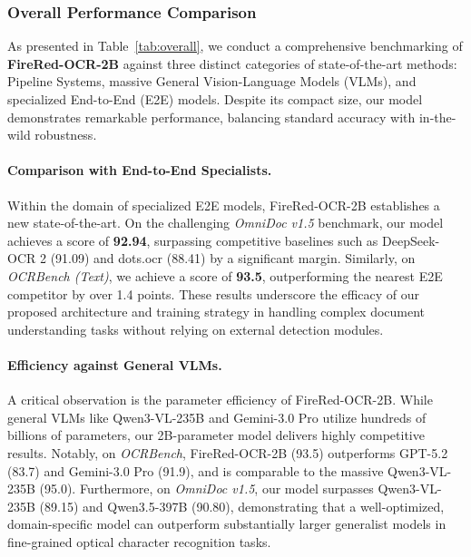 \subsubsection{Overall Performance Comparison}
As presented in Table~\ref{tab:overall}, we conduct a comprehensive benchmarking of \textbf{FireRed-OCR-2B} against three distinct categories of state-of-the-art methods: Pipeline Systems, massive General Vision-Language Models (VLMs), and specialized End-to-End (E2E) models. Despite its compact size, our model demonstrates remarkable performance, balancing standard accuracy with in-the-wild robustness.

\paragraph{Comparison with End-to-End Specialists.}
Within the domain of specialized E2E models, FireRed-OCR-2B establishes a new state-of-the-art. On the challenging \textit{OmniDoc v1.5} benchmark, our model achieves a score of \textbf{92.94}, surpassing competitive baselines such as DeepSeek-OCR 2 (91.09) and dots.ocr (88.41) by a significant margin. Similarly, on \textit{OCRBench (Text)}, we achieve a score of \textbf{93.5}, outperforming the nearest E2E competitor by over 1.4 points. These results underscore the efficacy of our proposed architecture and training strategy in handling complex document understanding tasks without relying on external detection modules.

\paragraph{Efficiency against General VLMs.}
A critical observation is the parameter efficiency of FireRed-OCR-2B. While general VLMs like Qwen3-VL-235B and Gemini-3.0 Pro utilize hundreds of billions of parameters, our 2B-parameter model delivers highly competitive results. Notably, on \textit{OCRBench}, FireRed-OCR-2B (93.5) outperforms GPT-5.2 (83.7) and Gemini-3.0 Pro (91.9), and is comparable to the massive Qwen3-VL-235B (95.0). Furthermore, on \textit{OmniDoc v1.5}, our model surpasses Qwen3-VL-235B (89.15) and Qwen3.5-397B (90.80), demonstrating that a well-optimized, domain-specific model can outperform substantially larger generalist models in fine-grained optical character recognition tasks.

